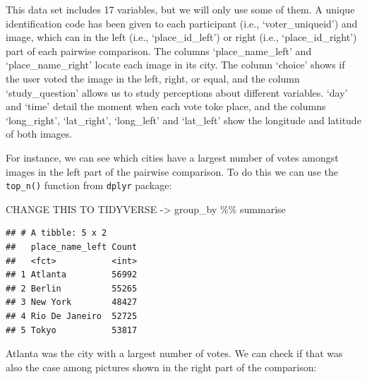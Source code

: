 \documentclass[
]{article}
\newenvironment{Shaded}{\begin{snugshade}}{\end{snugshade}}
\newcommand{\DataTypeTok}[1]{\textcolor[rgb]{0.13,0.29,0.53}{#1}}
\newcommand{\DecValTok}[1]{\textcolor[rgb]{0.00,0.00,0.81}{#1}}
\newcommand{\KeywordTok}[1]{\textcolor[rgb]{0.13,0.29,0.53}{\textbf{#1}}}
\newcommand{\NormalTok}[1]{#1}
\newcommand{\OperatorTok}[1]{\textcolor[rgb]{0.81,0.36,0.00}{\textbf{#1}}}
\newcommand{\StringTok}[1]{\textcolor[rgb]{0.31,0.60,0.02}{#1}}
\begin{document}
This data set includes 17 variables, but we will only use some of them.
A unique identification code has been given to each participant (i.e.,
`voter\_uniqueid') and image, which can in the left (i.e.,
`place\_id\_left') or right (i.e., `place\_id\_right') part of each
pairwise comparison. The columns `place\_name\_left' and
`place\_name\_right' locate each image in its city. The column `choice'
shows if the user voted the image in the left, right, or equal, and the
column `study\_question' allows us to study perceptions about different
variables. `day' and `time' detail the moment when each vote toke place,
and the columns `long\_right', `lat\_right', `long\_left' and
`lat\_left' show the longitude and latitude of both images.

For instance, we can see which cities have a largest number of votes
amongst images in the left part of the pairwise comparison. To do this
we can use the \texttt{top\_n()} function from \texttt{dplyr} package:

CHANGE THIS TO TIDYVERSE -\textgreater{} group\_by \%\% summarise

\begin{Shaded}
\end{Shaded}

\begin{verbatim}
## # A tibble: 5 x 2
##   place_name_left Count
##   <fct>           <int>
## 1 Atlanta         56992
## 2 Berlin          55265
## 3 New York        48427
## 4 Rio De Janeiro  52725
## 5 Tokyo           53817
\end{verbatim}

Atlanta was the city with a largest number of votes. We can check if
that was also the case among pictures shown in the right part of the
comparison:

\begin{Shaded}
\end{Shaded}
\end{document}
